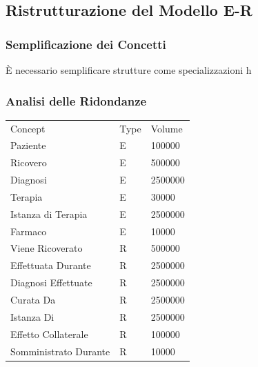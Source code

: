 \documentclass{article}
\begin{document}

%

\subsection{Ristrutturazione del Modello E-R}
\subsubsection{Semplificazione dei Concetti}
È necessario semplificare strutture come specializzazioni h



\subsubsection{Analisi delle Ridondanze}

\begin{table}[]
  \begin{tabular}{lll}
  Concept & Type & Volume \\
  Paziente & E & 100000 \\
  Ricovero & E & 500000 \\
  Diagnosi & E & 2500000 \\
  Terapia & E & 30000 \\
  Istanza di Terapia & E & 2500000 \\
  Farmaco & E & 10000 \\
  Viene Ricoverato & R & 500000 \\
  Effettuata Durante & R & 2500000 \\
  Diagnosi Effettuate & R & 2500000 \\
  Curata Da & R & 2500000 \\
  Istanza Di & R & 2500000 \\
  Effetto Collaterale & R & 100000 \\
  Somministrato Durante  & R & 10000 \\
  \end{tabular}
  \end{table}
\end{document}
